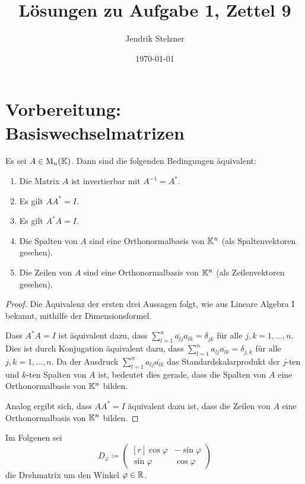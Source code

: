 \documentclass[a4paper,10pt]{scrartcl}
\title{Lösungen zu Aufgabe 1, Zettel 9}
\author{Jendrik Stelzner}
\date{\today}
\begin{document}
\maketitle



\section{Vorbereitung: Basiswechselmatrizen}


\begin{lemma}
  Es sei $A \in \operatorname{M}_n(\mathbb{K})$.
  Dann sind die folgenden Bedingungen äquivalent:
  \begin{enumerate}
    \item
      Die Matrix $A$ ist invertierbar mit $A^{-1} = A^*$.
    \item
      Es gilt $A A^* = I$.
    \item
      Es gilt $A^* A = I$.
    \item
      Die Spalten von $A$ sind eine Orthonormalbasis von $\mathbb{K}^n$ (als Spaltenvektoren gesehen).
    \item
      Die Zeilen von $A$ sind eine Orthonormalbasis von $\mathbb{K}^n$ (als Zeilenvektoren gesehen).
  \end{enumerate}
\end{lemma}
\begin{proof}
  Die Äquivalenz der ersten drei Aussagen folgt, wie aus Lineare Algebra I bekannt, mithilfe der Dimensionsformel.
  
  Dass $A^* A = I$ ist äquivalent dazu, dass $\sum_{l=1}^n \overline{a_{lj}} a_{lk} = \delta_{jk}$ für alle $j,k = 1, \dotsc, n$.
  Dies ist durch Konjugation äquivalent dazu, dass $\sum_{l=1}^n a_{lj} \overline{a_{lk}} = \delta_{j,k}$ für alle $j, k = 1, \dotsc, n$.
  Da der Ausdruck $\sum_{l=1}^n a_{lj} \overline{a_{lk}}$ das Standardskalarprodukt der $j$-ten und $k$-ten Spalten von $A$ ist, bedeutet dies gerade, dass die Spalten von $A$ eine Orthonormalbasis von $\mathbb{K}^n$ bilden.
  
  Analog ergibt sich, dass $A A^* = I$ äquivalent dazu ist, dass die Zeilen von $A$ eine Orthonormalbasis von $\mathbb{K}^n$ bilden.
\end{proof}


Im Folgenen sei
\[
  D_\varphi
  \coloneqq
  \begin{pmatrix*}[r]
    \cos \varphi  & -\sin \varphi \\
    \sin \varphi  &  \cos \varphi
  \end{pmatrix*}
\]
die Drehmatrix um den Winkel $\varphi \in \mathbb{R}$.
\end{document}
